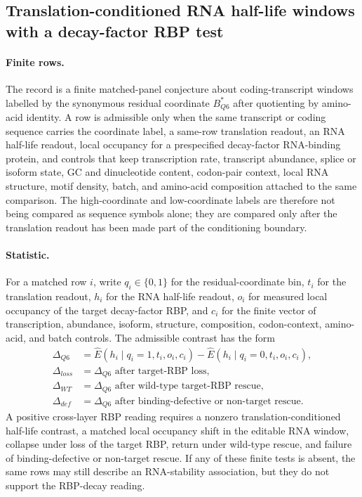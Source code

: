 \subsection{Translation-conditioned RNA half-life windows with a decay-factor RBP test}
\label{subsec:q6-translation-conditioned-rna-half-life-rbp-bridge-cross-layer}

\paragraph{Finite rows.}
The record is a finite matched-panel conjecture about coding-transcript windows labelled by the synonymous residual coordinate $B^{*}_{Q6}$ after quotienting by amino-acid identity.  A row is admissible only when the same transcript or coding sequence carries the coordinate label, a same-row translation readout, an RNA half-life readout, local occupancy for a prespecified decay-factor RNA-binding protein, and controls that keep transcription rate, transcript abundance, splice or isoform state, GC and dinucleotide content, codon-pair context, local RNA structure, motif density, batch, and amino-acid composition attached to the same comparison.  The high-coordinate and low-coordinate labels are therefore not being compared as sequence symbols alone; they are compared only after the translation readout has been made part of the conditioning boundary.

\paragraph{Statistic.}
For a matched row $i$, write $q_i \in \{0,1\}$ for the residual-coordinate bin, $t_i$ for the translation readout, $h_i$ for the RNA half-life readout, $o_i$ for measured local occupancy of the target decay-factor RBP, and $c_i$ for the finite vector of transcription, abundance, isoform, structure, composition, codon-context, amino-acid, and batch controls.  The admissible contrast has the form
$$
\begin{aligned}
\Delta_{Q6} &= \widehat{E}(h_i \mid q_i=1,t_i,o_i,c_i)-\widehat{E}(h_i \mid q_i=0,t_i,o_i,c_i),\\
\Delta_{loss} &= \Delta_{Q6}\text{ after target-RBP loss},\\
\Delta_{WT} &= \Delta_{Q6}\text{ after wild-type target-RBP rescue},\\
\Delta_{def} &= \Delta_{Q6}\text{ after binding-defective or non-target rescue}.
\end{aligned}
$$
A positive cross-layer RBP reading requires a nonzero translation-conditioned half-life contrast, a matched local occupancy shift in the editable RNA window, collapse under loss of the target RBP, return under wild-type rescue, and failure of binding-defective or non-target rescue.  If any of these finite tests is absent, the same rows may still describe an RNA-stability association, but they do not support the RBP-decay reading.


